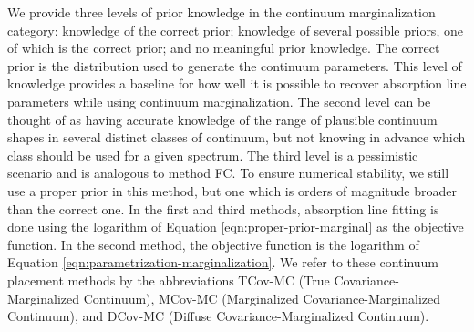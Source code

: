 \documentclass[manuscript]{aastex62}
\begin{document}
{We provide three levels of prior knowledge in the continuum marginalization category: knowledge of the correct prior; knowledge of several possible priors, one of which is the correct prior; and no meaningful prior knowledge.
The correct prior is the distribution used to generate the continuum parameters.
This level of knowledge provides a baseline for how well it is possible to recover absorption line parameters while using continuum marginalization.
The second level can be thought of as having accurate knowledge of the range of plausible continuum shapes in several distinct classes of continuum, but not knowing in advance which class should be used for a given spectrum.
The third level is a pessimistic scenario and is analogous to method FC.
To ensure numerical stability, we still use a proper prior in this method, but one which is orders of magnitude broader than the correct one.
In the first and third methods, absorption line fitting is done using the logarithm of Equation \ref{eqn:proper-prior-marginal} as the objective function.
In the second method, the objective function is the logarithm of Equation \ref{eqn:parametrization-marginalization}.
We refer to these continuum placement methods by the abbreviations TCov-MC (True Covariance-Marginalized Continuum), MCov-MC (Marginalized Covariance-Marginalized Continuum), and DCov-MC (Diffuse Covariance-Marginalized Continuum).

}
\end{document}
